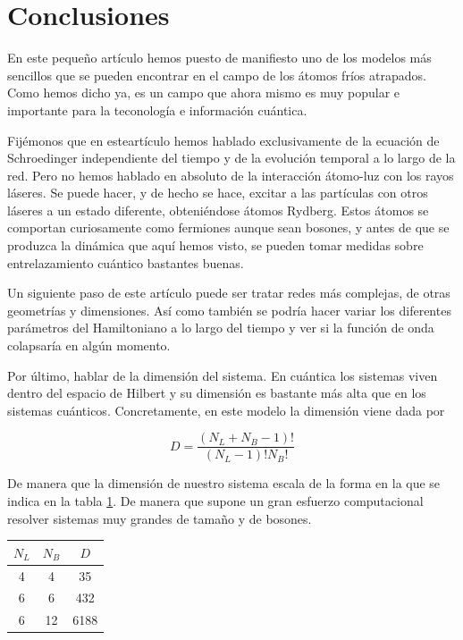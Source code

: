 \documentclass[11pt,a4paper]{article}
\begin{document}
\section{Conclusiones}

En este  pequeño artículo hemos puesto de manifiesto uno de los modelos más sencillos que se pueden encontrar en el campo de los átomos fríos atrapados. Como hemos dicho ya, es un campo que ahora mismo es muy popular e importante para la teconología e información cuántica.

Fijémonos que en esteartículo hemos hablado exclusivamente de la ecuación de Schroedinger independiente del tiempo y de la evolución temporal a lo largo de la red. Pero no hemos hablado en absoluto de la interacción átomo-luz con los rayos láseres. Se puede hacer, y de hecho se hace, excitar a las partículas con otros láseres a un estado diferente, obteniéndose átomos Rydberg. Estos átomos se comportan curiosamente como fermiones aunque sean bosones, y antes de que se produzca la dinámica que aquí hemos visto, se pueden tomar medidas sobre entrelazamiento cuántico bastantes buenas.

Un siguiente paso de este artículo puede ser tratar redes más complejas, de otras geometrías y dimensiones. Así como también se podría hacer variar los diferentes parámetros del Hamiltoniano a lo largo del tiempo y ver si la función de onda colapsaría en algún momento.

Por último, hablar de la dimensión del sistema. En cuántica los sistemas viven dentro del espacio de Hilbert y su dimensión es bastante más alta que en los sistemas cuánticos. Concretamente, en este modelo la dimensión viene dada por

\begin{equation}
  D=\frac{(N_L+N_B-1)!}{(N_L-1)!N_B!}
\end{equation}

De manera que la dimensión de nuestro sistema escala de la forma en la que se indica en la tabla \ref{t:dimension}. De manera que supone un gran esfuerzo computacional resolver sistemas muy grandes de tamaño y de bosones.


\begin{table}[h]
  \centering
  
  \begin{tabular}{|c||c||c|}
    
    \hline
    $N_L$ & $N_B$ & $D$ \\
    \hline
    4 & 4 & 35 \\
    \hline
    6 & 6 & 432 \\
    \hline
    6 & 12 & 6188 \\
    \hline
  \end{tabular}
  \label{t:dimension}
\end{table}
\end{document}
